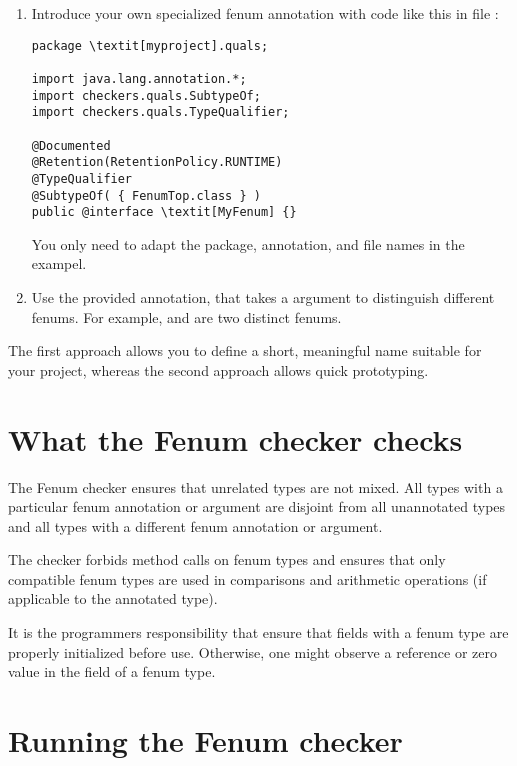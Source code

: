 \begin{enumerate}
\item Introduce your own specialized fenum annotation with code like this in
file :

\begin{Verbatim}[commandchars=\\\[\]]
package \textit[myproject].quals;

import java.lang.annotation.*;
import checkers.quals.SubtypeOf;
import checkers.quals.TypeQualifier;

@Documented
@Retention(RetentionPolicy.RUNTIME)
@TypeQualifier
@SubtypeOf( { FenumTop.class } )
public @interface \textit[MyFenum] {}
\end{Verbatim}

You only need to adapt the package, annotation, and file names in the exampel.


\item Use the provided  annotation, that takes a
 argument to distinguish different fenums.
For example,  and  are two distinct fenums.
\end{enumerate}


The first approach allows you to define a short, meaningful name suitable for
your project, whereas the second approach allows quick prototyping.



\section{What the Fenum checker checks}

The Fenum checker ensures that unrelated types are not mixed. 
All types with a particular fenum annotation or  argument are
disjoint from all unannotated types and all types with a different fenum
annotation or  argument.

The checker forbids method calls on fenum types and ensures that
only compatible fenum types are used in comparisons and arithmetic operations
(if applicable to the annotated type).

It is the programmers responsibility that ensure that fields with a fenum type
are properly initialized before use. Otherwise, one might observe a 
reference or zero value in the field of a fenum type.



\section{Running the Fenum checker}

